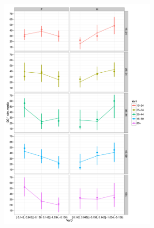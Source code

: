 \documentclass{article}
\makeatletter
\newenvironment{kframe}{%
 \def\FrameCommand##1{\hskip\@totalleftmargin \hskip-\fboxsep
 \colorbox{shadecolor}{##1}\hskip-\fboxsep
     \hskip-\linewidth \hskip-\@totalleftmargin \hskip\columnwidth}%
 \MakeFramed {\advance\hsize-\width
   \@totalleftmargin\z@ \linewidth\hsize
   \@setminipage}}%
 {\par\unskip\endMakeFramed}
\newenvironment{knitrout}{}{} %
\makeatother
\begin{document}
\begin{knitrout}
{\begin{kframe}
\includegraphics[width=12cm,height=12cm]{test} \end{kframe}}
\end{knitrout}
\end{document}
